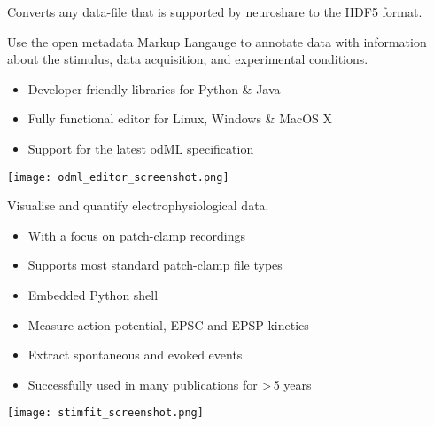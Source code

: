\begin{multicols}{3}

Converts any data-file that is supported by neuroshare to the HDF5 format.


Use the {open metadata Markup Langauge} to annotate data with information about the stimulus, data acquisition, and experimental conditions.

\begin{itemize}[nolistsep,topsep=0em,leftmargin=1pc]
\item Developer friendly libraries for Python \& Java
\item Fully functional editor for Linux, Windows \& MacOS X
\item Support for the latest odML specification
\end{itemize}

\texttt{[image: odml\_editor\_screenshot.png]}

%




Visualise and quantify electrophysiological data.
\begin{itemize}[nolistsep,topsep=0em,leftmargin=1pc]
\item With a focus on patch-clamp recordings
\item Supports most standard patch-clamp file types
\item Embedded Python shell
\item Measure action potential, EPSC and EPSP kinetics
\item Extract spontaneous and evoked events
\item Successfully used in many publications for >\,5 years
\end{itemize}
\texttt{[image: stimfit\_screenshot.png]}


\end{multicols}
